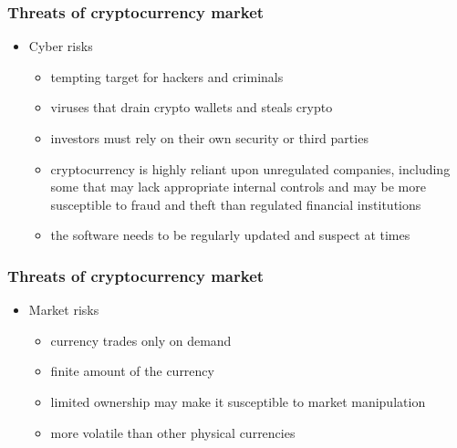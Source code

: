 \documentclass{beamer}
\begin{document}
\begin{frame}
    \frametitle{Threats of cryptocurrency market}
    \begin{itemize}
     \item<1-> Cyber risks
     \begin{itemize}
        \item<2-> tempting target for hackers and criminals
        \item<3-> viruses that drain crypto wallets and steals crypto
        \item<4-> investors must rely on their own security or third parties 
        \item<5-> cryptocurrency is highly reliant upon unregulated companies, including some 
        that may lack appropriate internal controls and may be more susceptible to fraud and theft 
        than regulated financial institutions
        \item<6-> the software needs to be regularly updated and suspect at times
     \end{itemize}
    \end{itemize}
\end{frame}
\begin{frame}
\frametitle{Threats of cryptocurrency market}
    \begin{itemize}
        \item<1-> Market risks
        \begin{itemize}
            \item<2-> currency trades only on demand
            \item<3-> finite amount of the currency 
            \item<4-> limited ownership may make it susceptible to market manipulation
            \item<5-> more volatile than other physical currencies
        \end{itemize}
    \end{itemize}
\end{frame}
\end{document}
